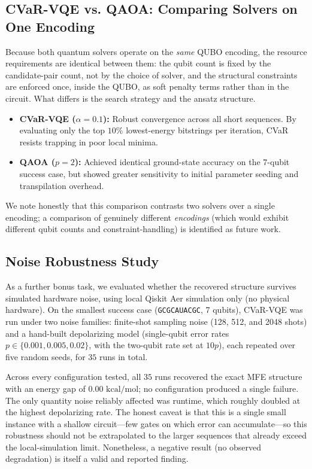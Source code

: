 \documentclass[11pt,a4paper]{article}
\begin{document}
	\subsection{CVaR-VQE vs. QAOA: Comparing Solvers on One Encoding}
	
	Because both quantum solvers operate on the \emph{same} QUBO encoding, the resource requirements are identical between them: the qubit count is fixed by the candidate-pair count, not by the choice of solver, and the structural constraints are enforced once, inside the QUBO, as soft penalty terms rather than in the circuit. What differs is the search strategy and the ansatz structure.
	\begin{itemize}[leftmargin=1.2cm]
		\item \textbf{CVaR-VQE ($\alpha = 0.1$):} Robust convergence across all short sequences. By evaluating only the top $10\%$ lowest-energy bitstrings per iteration, CVaR resists trapping in poor local minima.
		\item \textbf{QAOA ($p=2$):} Achieved identical ground-state accuracy on the 7-qubit success case, but showed greater sensitivity to initial parameter seeding and transpilation overhead.
	\end{itemize}
	We note honestly that this comparison contrasts two solvers over a single encoding; a comparison of genuinely different \emph{encodings} (which would exhibit different qubit counts and constraint-handling) is identified as future work.
	
	\subsection{Noise Robustness Study}
	
	As a further bonus task, we evaluated whether the recovered structure survives simulated hardware noise, using local Qiskit Aer simulation only (no physical hardware). On the smallest success case (\texttt{GCGCAUACGC}, 7 qubits), CVaR-VQE was run under two noise families: finite-shot sampling noise (128, 512, and 2048 shots) and a hand-built depolarizing model (single-qubit error rates $p \in \{0.001, 0.005, 0.02\}$, with the two-qubit rate set at $10p$), each repeated over five random seeds, for $35$ runs in total.
	
	Across every configuration tested, all $35$ runs recovered the exact MFE structure with an energy gap of $0.00\text{ kcal/mol}$; no configuration produced a single failure. The only quantity noise reliably affected was runtime, which roughly doubled at the highest depolarizing rate. The honest caveat is that this is a single small instance with a shallow circuit---few gates on which error can accumulate---so this robustness should not be extrapolated to the larger sequences that already exceed the local-simulation limit. Nonetheless, a negative result (no observed degradation) is itself a valid and reported finding.
	
\end{document}
